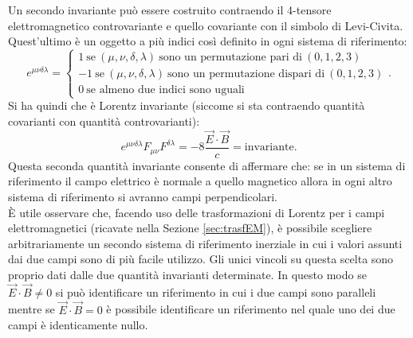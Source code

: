Un secondo invariante può essere costruito contraendo il 4-tensore elettromagnetico controvariante e quello covariante con il simbolo di Levi-Civita. Quest'ultimo è un oggetto a più indici così definito in ogni sistema di riferimento:
\begin{equation}
    e^{\mu\nu\delta\lambda}=\begin{cases}
        1\ \text{se}\ (\mu,\nu,\delta,\lambda)\ \text{sono un permutazione pari di}\ (0,1,2,3)\\
        -1\ \text{se}\ (\mu,\nu,\delta,\lambda)\ \text{sono un permutazione dispari di}\ (0,1,2,3)\\
        0\ \text{se almeno due indici sono uguali}
    \end{cases}.\label{LeviCivita}
\end{equation}
Si ha quindi che è Lorentz invariante (siccome si sta contraendo quantità covarianti con quantità controvarianti):
\begin{equation}
    e^{\mu\nu\delta\lambda}F_{\mu\nu}F^{\delta\lambda}=-8\frac{\vec E\cdot\vec B}{c}=\text{invariante}.
\end{equation}
Questa seconda quantità invariante consente di affermare che: se in un sistema di riferimento il campo elettrico è normale a quello magnetico allora in ogni altro sistema di riferimento si avranno campi perpendicolari.\\ È utile osservare che, facendo uso delle trasformazioni di Lorentz per i campi elettromagnetici (ricavate nella Sezione \ref{sec:trasfEM}), è possibile scegliere arbitrariamente un secondo sistema di riferimento inerziale in cui i valori assunti dai due campi sono di più facile utilizzo. Gli unici vincoli su questa scelta sono proprio dati dalle due quantità invarianti determinate. In questo modo se $\vec E \cdot \vec B\neq0$ si può identificare un riferimento in cui i due campi sono paralleli mentre se $\vec E \cdot \vec B=0$ è possibile identificare un riferimento nel quale uno dei due campi è identicamente nullo.\\

